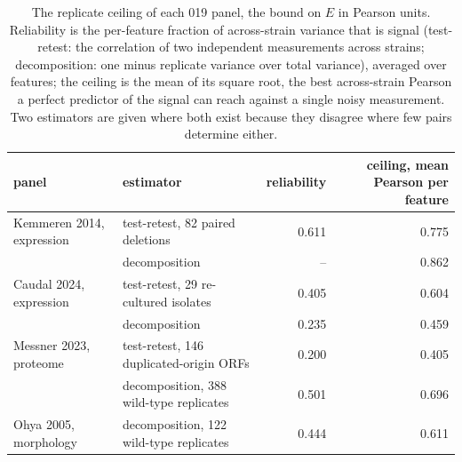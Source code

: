 \begin{table}[htbp]
\centering\footnotesize
\caption{The replicate ceiling of each 019 panel, the bound on $E$ in Pearson units. Reliability is the per-feature fraction of across-strain variance that is signal (test-retest: the correlation of two independent measurements across strains; decomposition: one minus replicate variance over total variance), averaged over features; the ceiling is the mean of its square root, the best across-strain Pearson a perfect predictor of the signal can reach against a single noisy measurement. Two estimators are given where both exist because they disagree where few pairs determine either.}
\label{tab:floors}
\begin{tabular}{llrr}
\toprule
panel & estimator & reliability & ceiling, mean Pearson per feature \\
\midrule
Kemmeren 2014, expression & test-retest, 82 paired deletions & 0.611 & 0.775 \\
 & decomposition & -- & 0.862 \\
Caudal 2024, expression & test-retest, 29 re-cultured isolates & 0.405 & 0.604 \\
 & decomposition & 0.235 & 0.459 \\
Messner 2023, proteome & test-retest, 146 duplicated-origin ORFs & 0.200 & 0.405 \\
 & decomposition, 388 wild-type replicates & 0.501 & 0.696 \\
Ohya 2005, morphology & decomposition, 122 wild-type replicates & 0.444 & 0.611 \\
\bottomrule
\end{tabular}
\end{table}
